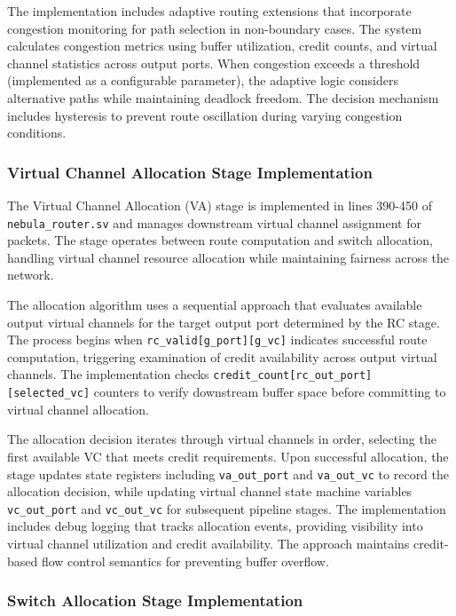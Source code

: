 \documentclass[12pt,letterpaper]{article}
\begin{document}
The implementation includes adaptive routing extensions that incorporate congestion monitoring for path selection in non-boundary cases. The system calculates congestion metrics using buffer utilization, credit counts, and virtual channel statistics across output ports. When congestion exceeds a threshold (implemented as a configurable parameter), the adaptive logic considers alternative paths while maintaining deadlock freedom. The decision mechanism includes hysteresis to prevent route oscillation during varying congestion conditions.

\subsubsection{Virtual Channel Allocation Stage Implementation}

The Virtual Channel Allocation (VA) stage is implemented in lines 390-450 of \texttt{nebula\_router.sv} and manages downstream virtual channel assignment for packets. The stage operates between route computation and switch allocation, handling virtual channel resource allocation while maintaining fairness across the network.

The allocation algorithm uses a sequential approach that evaluates available output virtual channels for the target output port determined by the RC stage. The process begins when \texttt{rc\_valid[g\_port][g\_vc]} indicates successful route computation, triggering examination of credit availability across output virtual channels. The implementation checks \texttt{credit\_count[rc\_out\_port][selected\_vc]} counters to verify downstream buffer space before committing to virtual channel allocation.

The allocation decision iterates through virtual channels in order, selecting the first available VC that meets credit requirements. Upon successful allocation, the stage updates state registers including \texttt{va\_out\_port} and \texttt{va\_out\_vc} to record the allocation decision, while updating virtual channel state machine variables \texttt{vc\_out\_port} and \texttt{vc\_out\_vc} for subsequent pipeline stages. The implementation includes debug logging that tracks allocation events, providing visibility into virtual channel utilization and credit availability. The approach maintains credit-based flow control semantics for preventing buffer overflow.

\subsubsection{Switch Allocation Stage Implementation}
\end{document}
